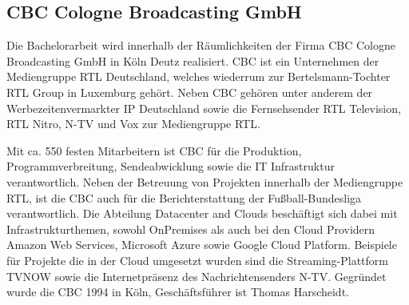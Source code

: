 \subsection{CBC Cologne Broadcasting GmbH}

Die Bachelorarbeit wird innerhalb der Räumlichkeiten der Firma CBC Cologne Broadcasting GmbH in Köln Deutz realisiert.
CBC ist ein Unternehmen der Mediengruppe RTL Deutschland, welches wiederrum zur Bertelsmann-Tochter RTL Group in Luxemburg gehört.
Neben CBC gehören unter anderem der Werbezeitenvermarkter IP Deutschland sowie die Fernsehsender RTL Television, RTL Nitro, N-TV und Vox zur Mediengruppe RTL.


Mit ca. 550 festen Mitarbeitern ist CBC für die Produktion, Programmverbreitung, Sendeabwicklung sowie die IT Infrastruktur verantwortlich.
Neben der Betreuung von Projekten innerhalb der Mediengruppe RTL, ist die CBC auch für die Berichterstattung der Fußball-Bundesliga verantwortlich.
Die Abteilung Datacenter and Clouds beschäftigt sich dabei mit Infrastrukturthemen, sowohl OnPremises als auch bei den Cloud Providern Amazon Web Services,
Microsoft Azure sowie Google Cloud Platform.
Beispiele für Projekte die in der Cloud umgesetzt wurden sind die Streaming-Plattform TVNOW sowie die Internetpräsenz des Nachrichtensenders N-TV.
Gegründet wurde die CBC 1994 in Köln, Geschäftsführer ist Thomas Harscheidt.

